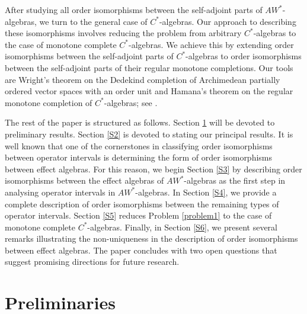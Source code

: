 \documentclass[12pt]{amsart}
\theoremstyle{definition}
\theoremstyle{remark}
\numberwithin{equation}{section}
\begin{document}
 




After studying all order isomorphisms between the self-adjoint parts of $AW^*$-algebras, we turn to the general case of $C^*$-algebras. Our approach to describing these isomorphisms involves reducing the problem from arbitrary $C^*$-algebras to the case of monotone complete $C^*$-algebras. We achieve this by extending order isomorphisms between the self-adjoint parts of $C^*$-algebras to order isomorphisms between the self-adjoint parts of their regular monotone completions. Our tools are  Wright's theorem on the Dedekind completion of  Archimedean partially ordered vector spaces with an order unit and Hamana's theorem on the regular monotone completion of $C^*$-algebras; see \cite{Hamana, Wright}.
  
  
  
  
  
  



The rest of the paper is structured as follows. Section \ref{S1}   will be devoted to preliminary results. Section \ref{S2} is devoted to  stating our principal results. It is well known that one of the cornerstones in classifying order isomorphisms between operator intervals is determining the form of order isomorphisms between effect algebras. For this reason, we begin Section \ref{S3} by describing order isomorphisms between the effect algebras of $AW^*$-algebras as the first step in analysing operator intervals in $AW^*$-algebras. In Section \ref{S4}, we provide a complete description of order isomorphisms between the remaining types of operator intervals. Section \ref{S5} reduces Problem \ref{problem1} to the case of monotone complete $C^*$-algebras. Finally, in Section \ref{S6}, we present several remarks illustrating the non-uniqueness in the description of order isomorphisms between effect algebras. The paper concludes with two open questions that suggest promising directions for future research.



\section{Preliminaries}\label{S1}
 
 
 
\end{document}
